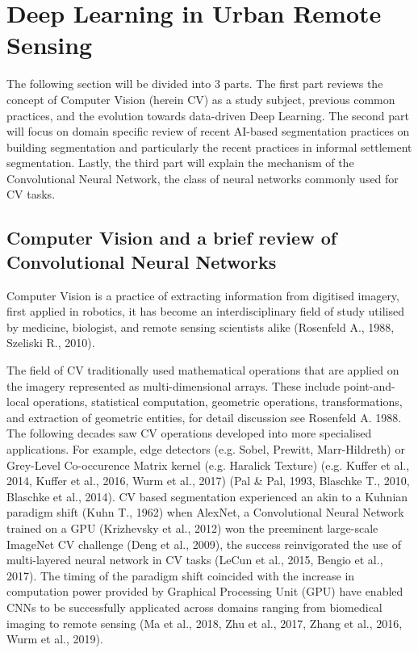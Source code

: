 \documentclass[11pt, a4paper, twoside]{report}
\begin{document}
\section{Deep Learning in Urban Remote Sensing}\label{DLinRS}

The following section will be divided into 3 parts. The first part reviews the concept of Computer Vision (herein CV) as a study subject, previous common practices, and the evolution towards data-driven Deep Learning. The second part will focus on domain specific review of recent AI-based segmentation practices on building segmentation and particularly the recent practices in informal settlement segmentation. Lastly, the third part will explain the mechanism of the Convolutional Neural Network, the class of neural networks commonly used for CV tasks.\\\par

\subsection{Computer Vision and a brief review of Convolutional Neural Networks}\label{CVinBS}

Computer Vision is a practice of extracting information from digitised imagery, first applied in robotics, it has become an interdisciplinary field of study utilised by medicine, biologist, and remote sensing scientists alike (Rosenfeld A., 1988, Szeliski R., 2010).\\\par

The field of CV traditionally used mathematical operations that are applied on the imagery represented as multi-dimensional arrays. These include point-and-local operations, statistical computation, geometric operations, transformations, and extraction of geometric entities, for detail discussion see Rosenfeld A. 1988. The following decades saw CV operations developed into more specialised applications. For example, edge detectors (e.g. Sobel, Prewitt, Marr-Hildreth) or Grey-Level Co-occurence Matrix kernel (e.g. Haralick Texture) (e.g. Kuffer et al., 2014, Kuffer et al., 2016, Wurm et al., 2017) (Pal \& Pal, 1993, Blaschke T., 2010, Blaschke et al., 2014). CV based segmentation experienced an akin to a Kuhnian paradigm shift (Kuhn T., 1962) when AlexNet, a Convolutional Neural Network trained on a GPU (Krizhevsky et al., 2012) won the preeminent large-scale ImageNet CV challenge (Deng et al., 2009), the success reinvigorated the use of multi-layered neural network in CV tasks (LeCun et al., 2015, Bengio et al., 2017). The timing of the paradigm shift coincided with the increase in computation power provided by Graphical Processing Unit (GPU) have enabled CNNs to be successfully applicated across domains ranging from biomedical imaging to remote sensing (Ma et al., 2018, Zhu et al., 2017, Zhang et al., 2016, Wurm et al., 2019).\\\par
\end{document}
